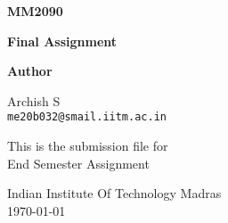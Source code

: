 \documentclass[12pt,a4paper]{article}
\begin{document}
\begin{titlepage}
	\begin{center}
		\vspace*{1cm}
		\Huge
		\textbf{MM2090}
		
		\vspace{0.5cm}
		\Large
		\textbf{Final Assignment}
            
		\vspace{1.5cm}
		\textbf{Author}\\
		\vspace{0.25cm}
		\normalsize
		
		\textsf{Archish S}\\
		\texttt{me20b032@smail.iitm.ac.in}
		\\
		
		\vfill
       
		This is the submission file for \\
		\Large       
		End Semester Assignment 
        
        \normalsize    
		\vspace{0.8cm}
           
		Indian Institute Of Technology Madras\\
		\today
            
	\end{center}
\end{titlepage}

\tableofcontents
\newpage


\clearpage

\clearpage

\clearpage

\clearpage

\clearpage

\clearpage
\end{document}
